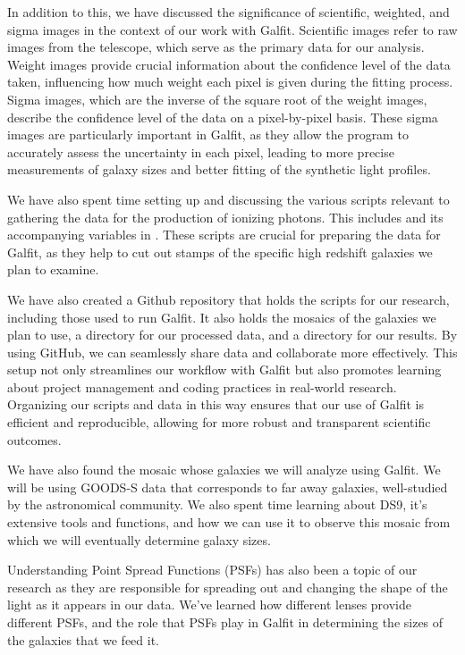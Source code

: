 \documentclass{article}
\begin{document}
In addition to this, we have discussed the significance of scientific, weighted, and sigma images in the context of our work with Galfit. Scientific images refer to raw images from the telescope, which serve as the primary data for our analysis. Weight images provide crucial information about the confidence level of the data taken, influencing how much weight each pixel is given during the fitting process. Sigma images, which are the inverse of the square root of the weight images, describe the confidence level of the data on a pixel-by-pixel basis. These sigma images are particularly important in Galfit, as they allow the program to accurately assess the uncertainty in each pixel, leading to more precise measurements of galaxy sizes and better fitting of the synthetic light profiles.

We have also spent time setting up and discussing the various scripts relevant to gathering the data for the production of ionizing photons. This includes  and its accompanying variables in . These scripts are crucial for preparing the data for Galfit, as they help to cut out stamps of the specific high redshift galaxies we plan to examine.

We have also created a Github repository that holds the scripts for our research, including those used to run Galfit. It also holds the mosaics of the galaxies we plan to use, a directory for our processed data, and a directory for our results. By using GitHub, we can seamlessly share data and collaborate more effectively. This setup not only streamlines our workflow with Galfit but also promotes learning about project management and coding practices in real-world research. Organizing our scripts and data in this way ensures that our use of Galfit is efficient and reproducible, allowing for more robust and transparent scientific outcomes.

We have also found the mosaic whose galaxies we will analyze using Galfit. We will be using GOODS-S data that corresponds to far away galaxies, well-studied by the astronomical community. We also spent time learning about DS9, it's extensive tools and functions, and how we can use it to observe this mosaic from which we will eventually determine galaxy sizes.

Understanding Point Spread Functions (PSFs) has also been a topic of our research as they are responsible for spreading out and changing the shape of the light as it appears in our data. We've learned how different lenses provide different PSFs, and the role that PSFs play in Galfit in determining the sizes of the galaxies that we feed it.
\end{document}
